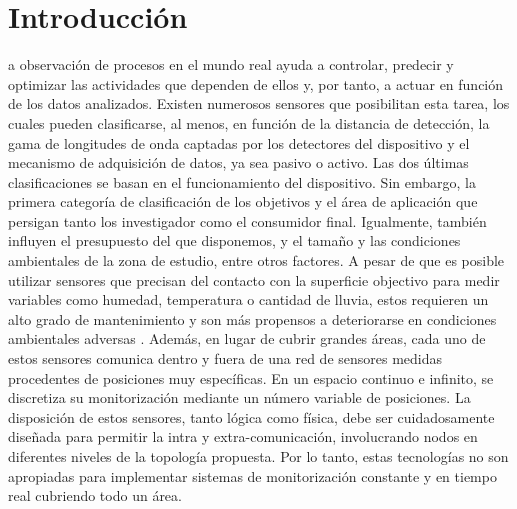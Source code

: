 \setchapterpreamble[u]{\margintoc}
\chapter*{Introducción}
\label{sec:introduction_spanish}

\lettrine[findent=0pt, lines=3]{}{ } a observación de procesos en el mundo real ayuda a controlar, predecir y optimizar las actividades que dependen de ellos y, por tanto, a actuar en función de los datos analizados. Existen numerosos sensores que posibilitan esta tarea, los cuales pueden clasificarse, al menos, en función de la distancia de detección, la gama de longitudes de onda captadas por los detectores del dispositivo y el mecanismo de adquisición de datos, ya sea pasivo o activo. Las dos últimas clasificaciones se basan en el funcionamiento del dispositivo. Sin embargo, la primera categoría de clasificación de los objetivos y el área de aplicación que persigan tanto los investigador como el consumidor final. Igualmente, también influyen el presupuesto del que disponemos, y el tamaño y las condiciones ambientales de la zona de estudio, entre otros factores. A pesar de que es posible utilizar sensores que precisan del contacto con la superficie objectivo para medir variables como humedad, temperatura o cantidad de lluvia, estos requieren un alto grado de mantenimiento y son más propensos a deteriorarse en condiciones ambientales adversas \cite{silva_low-cost_2019, morais_versatile_2021}. Además, en lugar de cubrir grandes áreas, cada uno de estos sensores comunica dentro y fuera de una red de sensores medidas procedentes de posiciones muy específicas. En un espacio continuo e infinito, se discretiza su monitorización mediante un número variable de posiciones. La disposición de estos sensores, tanto lógica como física, debe ser cuidadosamente diseñada para permitir la intra y extra-comunicación, involucrando nodos en diferentes niveles de la topología propuesta. Por lo tanto, estas tecnologías no son apropiadas para implementar sistemas de monitorización constante y en tiempo real cubriendo todo un área. 

